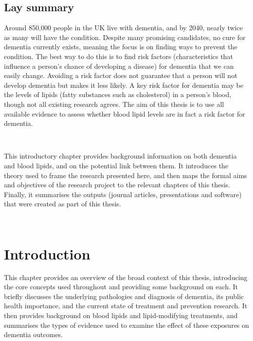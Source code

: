 \documentclass[a4paper, twoside]{templates/ociamthesis}
\begin{document}
\begin{laybox}

\hypertarget{lay-summary}{%
\section*{Lay summary}\label{lay-summary}}

Around 850,000 people in the UK live with dementia, and by 2040, nearly twice as many will have the condition. Despite many promising candidates, no cure for dementia currently exists, meaning the focus is on finding ways to prevent the condition. The best way to do this is to find risk factors (characteristics that influence a person's chance of developing a disease) for dementia that we can easily change. Avoiding a risk factor does not guarantee that a person will not develop dementia but makes it less likely. A key risk factor for dementia may be the levels of lipids (fatty substances such as cholesterol) in a person's blood, though not all existing research agrees. The aim of this thesis is to use all available evidence to assess whether blood lipid levels are in fact a risk factor for dementia.

~

This introductory chapter provides background information on both dementia and blood lipids, and on the potential link between them. It introduces the theory used to frame the research presented here, and then maps the formal aims and objectives of the research project to the relevant chapters of this thesis. Finally, it summarises the outputs (journal articles, presentations and software) that were created as part of this thesis.

\end{laybox}

~

\hypertarget{introduction}{%
\section{Introduction}\label{introduction}}

This chapter provides an overview of the broad context of this thesis, introducing the core concepts used throughout and providing some background on each. It briefly discusses the underlying pathologies and diagnosis of dementia, its public health importance, and the current state of treatment and prevention research. It then provides background on blood lipids and lipid-modifying treatments, and summarises the types of evidence used to examine the effect of these exposures on dementia outcomes.
\end{document}
